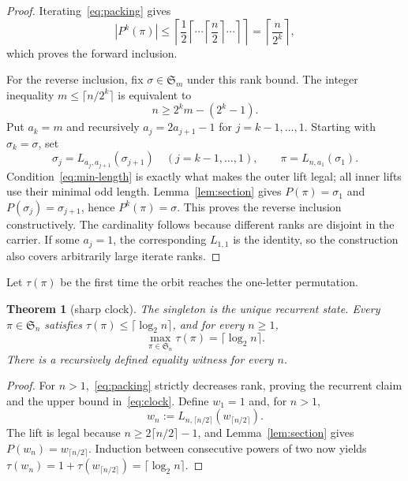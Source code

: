 \documentclass[a4paper,10pt]{amsart}
\newtheorem{theorem}{Theorem}
\theoremstyle{definition}
\theoremstyle{remark}
\newcommand{\Sn}{\mathfrak S}
\begin{document}
\begin{proof}
Iterating~\eqref{eq:packing} gives
\[
 |P^k(\pi)|\le
 \left\lceil\frac{1}{2}
   \left\lceil\cdots\left\lceil\frac n2\right\rceil\cdots\right\rceil
 \right\rceil
 =\left\lceil\frac n{2^k}\right\rceil,
\]
which proves the forward inclusion.

For the reverse inclusion, fix $\sigma\in\Sn_m$ under this rank bound.  The
integer inequality $m\le\lceil n/2^k\rceil$ is equivalent to
\begin{equation}\label{eq:min-length}
                    n\ge 2^km-(2^k-1).
\end{equation}
Put $a_k=m$ and recursively $a_j=2a_{j+1}-1$ for
$j=k-1,\ldots,1$.  Starting with $\sigma_k=\sigma$, set
\[
 \sigma_j=L_{a_j,a_{j+1}}(\sigma_{j+1})
       \quad(j=k-1,\ldots,1),
 \qquad
 \pi=L_{n,a_1}(\sigma_1).
\]
Condition~\eqref{eq:min-length} is exactly what makes the outer lift legal;
all inner lifts use their minimal odd length.  Lemma~\ref{lem:section} gives
$P(\pi)=\sigma_1$ and $P(\sigma_j)=\sigma_{j+1}$, hence
$P^k(\pi)=\sigma$.  This proves the reverse inclusion constructively.  The
cardinality follows because different ranks are disjoint in the carrier.  If
some $a_j=1$, the corresponding $L_{1,1}$ is the identity, so the construction
also covers arbitrarily large iterate ranks.
\end{proof}

Let $\tau(\pi)$ be the first time the orbit reaches the one-letter
permutation.

\begin{theorem}[sharp clock]\label{thm:clock}
The singleton is the unique recurrent state.  Every $\pi\in\Sn_n$ satisfies
$\tau(\pi)\le\lceil\log_2n\rceil$, and for every $n\ge1$,
\begin{equation}\label{eq:clock}
                 \max_{\pi\in\Sn_n}\tau(\pi)=\lceil\log_2n\rceil.
\end{equation}
There is a recursively defined equality witness for every $n$.
\end{theorem}

\begin{proof}
For $n>1$,~\eqref{eq:packing} strictly decreases rank, proving the recurrent
claim and the upper bound in~\eqref{eq:clock}.  Define $w_1=1$ and, for
$n>1$,
\begin{equation}\label{eq:witness}
 w_n:=L_{n,\lceil n/2\rceil}
           (w_{\lceil n/2\rceil}).
\end{equation}
The lift is legal because $n\ge2\lceil n/2\rceil-1$, and
Lemma~\ref{lem:section} gives $P(w_n)=w_{\lceil n/2\rceil}$.  Induction
between consecutive powers of two now yields
$\tau(w_n)=1+\tau(w_{\lceil n/2\rceil})=\lceil\log_2n\rceil$.
\end{proof}
\end{document}
